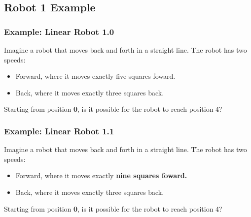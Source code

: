 \documentclass{beamer}
\begin{document}
\subsection{Robot 1 Example}
\begin{frame}
  \frametitle{Example: Linear Robot 1.0}

  {\larger
    Imagine a robot that moves back and forth in a straight
    line. The robot has two speeds:

    \bigskip
    
    \begin{itemize}
    \item Forward, where it moves exactly \alert{five squares foward}.
    \item Back, where it moves exactly \alert{three squares back}.
    \end{itemize}

    \bigskip

    Starting from position {\bf 0}, is it possible for the robot to
    reach position 4?
  }  
\end{frame}

\begin{frame}
  \frametitle{Example: Linear Robot 1.1}
    {\larger
    Imagine a robot that moves back and forth in a straight
    line. The robot has two speeds:

    \bigskip
    
    \begin{itemize}
    \item Forward, where it moves exactly {\bf\alert{nine squares foward}.}
    \item Back, where it moves exactly \alert{three squares back}.
    \end{itemize}

    \bigskip

    Starting from position {\bf 0}, is it possible for the robot to
    reach position 4?

    \bigskip

  } 
\end{frame}
\end{document}
